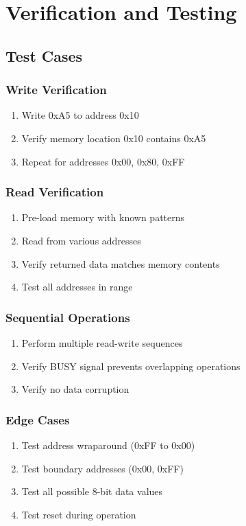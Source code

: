 \documentclass[12pt,a4paper]{article}
\begin{document}
\section{Verification and Testing}

\subsection{Test Cases}

\subsubsection{Write Verification}
\begin{enumerate}
    \item Write 0xA5 to address 0x10
    \item Verify memory location 0x10 contains 0xA5
    \item Repeat for addresses 0x00, 0x80, 0xFF
\end{enumerate}

\subsubsection{Read Verification}
\begin{enumerate}
    \item Pre-load memory with known patterns
    \item Read from various addresses
    \item Verify returned data matches memory contents
    \item Test all addresses in range
\end{enumerate}

\subsubsection{Sequential Operations}
\begin{enumerate}
    \item Perform multiple read-write sequences
    \item Verify BUSY signal prevents overlapping operations
    \item Verify no data corruption
\end{enumerate}

\subsubsection{Edge Cases}
\begin{enumerate}
    \item Test address wraparound (0xFF to 0x00)
    \item Test boundary addresses (0x00, 0xFF)
    \item Test all possible 8-bit data values
    \item Test reset during operation
\end{enumerate}
\end{document}
